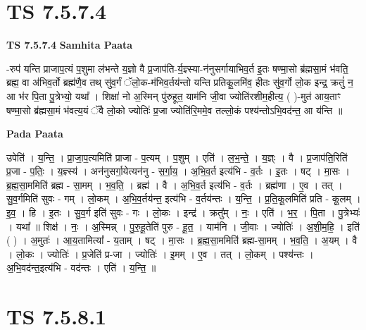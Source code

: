 \documentclass[17pt]{extarticle}
\begin{document}

\section{ TS 7.5.7.4 }

\textbf{TS 7.5.7.4 } \newline
\textbf{Samhita Paata} \newline

-रुप॑ यन्ति प्राजाप॒त्यं प॒शुमा ल॑भन्ते य॒ज्ञो वै प्र॒जाप॑ति-र्य॒ज्ञ्स्या-न॑नुसर्गायाभिव॒र्त इ॒तः षण्मा॒सो ब्र॑ह्मसा॒मं भ॑वति॒ ब्रह्म॒ वा अ॑भिव॒र्तो ब्रह्म॑णै॒व तथ् सु॑व॒र्गं ॅलो॒क-म॑भिव॒र्तय॑न्तो यन्ति प्रतिकू॒लमि॑व॒ हीतः सु॑व॒र्गो लो॒क इन्द्र॒ क्रतुं॑ न॒ आ भ॑र पि॒ता पु॒त्रेभ्यो॒ यथा᳚ । शिक्षा॑ नो अ॒स्मिन् पु॑रुहूत॒ याम॑नि जी॒वा ज्योति॑रशीम॒हीत्य॒ ( )-मुत॑ आय॒ताꣳ षण्मा॒सो ब्र॑ह्मसा॒मं भ॑वत्य॒यं ॅवै लो॒को ज्योतिः॑ प्र॒जा ज्योति॑रि॒ममे॒व तल्लो॒कं पश्य॑न्तोऽभि॒वद॑न्त॒ आ य॑न्ति ॥ \newline

\textbf{Pada Paata} \newline

उपेति॑ । य॒न्ति॒ । प्रा॒जा॒प॒त्यमिति॑ प्राजा - प॒त्यम् । प॒शुम् । एति॑ । ल॒भ॒न्ते॒ । य॒ज्ञ्ः । वै । प्र॒जाप॑ति॒रिति॑ प्र॒जा - प॒तिः॒ । य॒ज्ञ्स्य॑ । अन॑नुसर्गा॒येत्यन॑नु - स॒र्गा॒य॒ । अ॒भि॒व॒र्त इत्य॑भि - व॒र्तः । इ॒तः । षट् । मा॒सः । ब्र॒ह्म॒सा॒ममिति॑ ब्रह्म - सा॒मम् । भ॒व॒ति॒ । ब्रह्म॑ । वै । अ॒भि॒व॒र्त इत्य॑भि - व॒र्तः । ब्रह्म॑णा । ए॒व । तत् । सु॒व॒र्गमिति॑ सुवः - गम् । लो॒कम् । अ॒भि॒व॒र्तय॑न्त॒ इत्य॑भि - व॒र्तय॑न्तः । य॒न्ति॒ । प्र॒ति॒कू॒लमिति॑ प्रति - कू॒लम् । इ॒व॒ । हि । इ॒तः । सु॒व॒र्ग इति॑ सुवः - गः । लो॒कः । इन्द्र॑ । क्रतु᳚म् । नः॒ । एति॑ । भ॒र॒ । पि॒ता । पु॒त्रेभ्यः॑ । यथा᳚ ॥ शिक्ष॑ । नः॒ । अ॒स्मिन्न् । पु॒रु॒हू॒तेति॑ पुरु - हू॒त॒ । याम॑नि । जी॒वाः । ज्योतिः॑ । अ॒शी॒म॒हि॒ । इति॑ ( ) । अ॒मुतः॑ । आ॒य॒तामित्या᳚ - य॒ताम् । षट् । मा॒सः । ब्र॒ह्म॒सा॒ममिति॑ ब्रह्म-सा॒मम् । भ॒व॒ति॒ । अ॒यम् । वै । लो॒कः । ज्योतिः॑ । प्र॒जेति॑ प्र-जा । ज्योतिः॑ । इ॒मम् । ए॒व । तत् । लो॒कम् । पश्य॑न्तः । अ॒भि॒वद॑न्त॒इत्य॑भि - वद॑न्तः । एति॑ । य॒न्ति॒ ॥  \newline





\section{ TS 7.5.8.1 }
\end{document}
